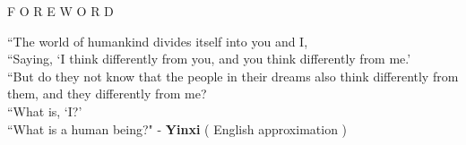 \documentclass[12pt]{article}
\begin{document}
\begingroup
\begin{center}
\end{center}
\endgroup

\vspace{15\baselineskip}

\begingroup
\begin{center}
\huge F O R E W O R D
\end{center}
\endgroup

\vspace{3\baselineskip}

\begingroup
``The world of humankind divides itself into you and I, \\
``Saying, `I think differently from you, and you think differently from me.' \\
``But do they not know that the people in their dreams also think differently from them, and they differently from me? \\
``What is, `I?' \\
``What is a human being?"
\phantom{text} \hfill - \textbf{Yinxi} ( English approximation ) \\
\endgroup
\end{document}
